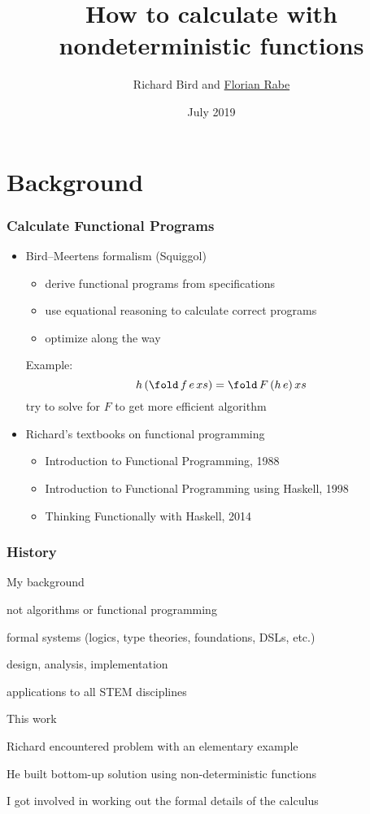 \documentclass{beamer}
\begin{document}
\title{How to calculate with nondeterministic functions}
\author{Richard Bird and \underline{Florian Rabe}}
\date{July 2019}
\begin{frame}
    \titlepage
\end{frame}

\section{Background}

\begin{frame}\frametitle{Calculate Functional Programs}
\begin{itemize}
\item Bird–Meertens formalism (Squiggol)
 \begin{itemize}
 \item derive functional programs from specifications
 \item use equational reasoning to calculate correct programs
 \item optimize along the way
 \end{itemize}
 Example: \[h\,(\fold\,f\,e\,xs) = \fold\,F\,(h\,e)\, xs\]
 try to solve for $F$ to get more efficient algorithm
\item Richard's textbooks on functional programming
 \begin{itemize}
 \item Introduction to Functional Programming, 1988
 \item Introduction to Functional Programming using Haskell, 1998
 \item Thinking Functionally with Haskell, 2014
 \end{itemize} 
\end{itemize}
\end{frame}

\begin{frame}\frametitle{History}
\begin{blockitems}{My background}
\item not algorithms or functional programming
\item formal systems (logics, type theories, foundations, DSLs, etc.)
\item design, analysis, implementation
\item applications to all STEM disciplines
\end{blockitems}

\begin{blockitems}{This work}
\item Richard encountered problem with an elementary example
\item He built bottom-up solution using non-deterministic functions
\item I got involved in working out the formal details of the calculus
\end{blockitems}
\end{frame}
\end{document}
